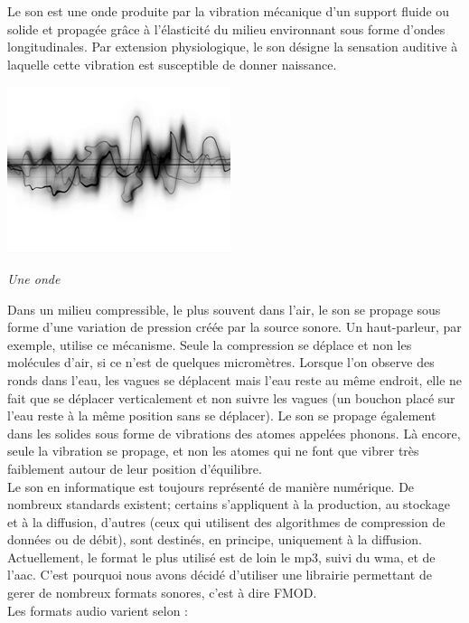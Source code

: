 \documentclass[12pt,a4paper]{report}
\begin{document}
Le son est une onde produite par la vibration mécanique d'un support fluide ou solide et propagée grâce à l'élasticité du milieu environnant sous forme d'ondes longitudinales. Par extension physiologique, le son désigne la sensation auditive à laquelle cette vibration est susceptible de donner naissance.\\
\begin{center}

\includegraphics[scale=0.7]{onde.jpg}

\it{Une onde}
\end{center}

Dans un milieu compressible, le plus souvent dans l'air, le son se propage sous forme d'une variation de pression créée par la source sonore. Un haut-parleur, par exemple, utilise ce mécanisme. Seule la compression se déplace et non les molécules d'air, si ce n'est de quelques micromètres. Lorsque l'on observe des ronds dans l'eau, les vagues se déplacent mais l'eau reste au même endroit, elle ne fait que se déplacer verticalement et non suivre les vagues (un bouchon placé sur l'eau reste à la même position sans se déplacer). Le son se propage également dans les solides sous forme de vibrations des atomes appelées phonons. Là encore, seule la vibration se propage, et non les atomes qui ne font que vibrer très faiblement autour de leur position d'équilibre.\\

Le son en informatique est toujours représenté de manière numérique. De nombreux standards existent; certains s'appliquent à la production, au stockage et à la diffusion, d'autres (ceux qui utilisent des algorithmes de compression de données ou de débit), sont destinés, en principe, uniquement à la diffusion. Actuellement, le format le plus utilisé est de loin le mp3, suivi du wma, et de l'aac. C'est pourquoi nous avons décidé d'utiliser une librairie permettant de gerer de nombreux formats sonores, c'est à dire FMOD.\\


Les formats audio varient selon :\\
\end{document}
